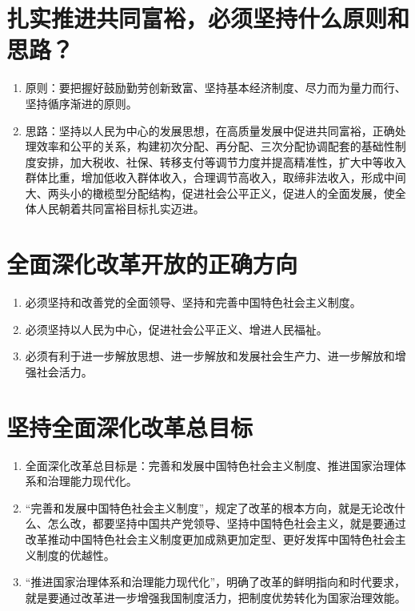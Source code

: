 \documentclass[12pt, a4paper, oneside]{ctexbook}
\begin{document}
\section{扎实推进共同富裕，必须坚持什么原则和思路？}

\begin{enumerate}
\item 原则：要把握好鼓励勤劳创新致富、坚持基本经济制度、尽力而为量力而行、坚持循序渐进的原则。

\item 思路：坚持以人民为中心的发展思想，在高质量发展中促进共同富裕，正确处理效率和公平的关系，构建初次分配、再分配、三次分配协调配套的基础性制度安排，加大税收、社保、转移支付等调节力度并提高精准性，扩大中等收入群体比重，增加低收入群体收入，合理调节高收入，取缔非法收入，形成中间大、两头小的橄榄型分配结构，促进社会公平正义，促进人的全面发展，使全体人民朝着共同富裕目标扎实迈进。
\end{enumerate}

\section{全面深化改革开放的正确方向}

\begin{enumerate}
\item 必须坚持和改善党的全面领导、坚持和完善中国特色社会主义制度。

\item 必须坚持以人民为中心，促进社会公平正义、增进人民福祉。

\item 必须有利于进一步解放思想、进一步解放和发展社会生产力、进一步解放和增强社会活力。
\end{enumerate}

\section{坚持全面深化改革总目标}

\begin{enumerate}
\item 全面深化改革总目标是：完善和发展中国特色社会主义制度、推进国家治理体系和治理能力现代化。

\item “完善和发展中国特色社会主义制度”，规定了改革的根本方向，就是无论改什么、怎么改，都要坚持中国共产党领导、坚持中国特色社会主义，就是要通过改革推动中国特色社会主义制度更加成熟更加定型、更好发挥中国特色社会主义制度的优越性。

\item “推进国家治理体系和治理能力现代化”，明确了改革的鲜明指向和时代要求，就是要通过改革进一步增强我国制度活力，把制度优势转化为国家治理效能。
\end{enumerate}
\end{document}

